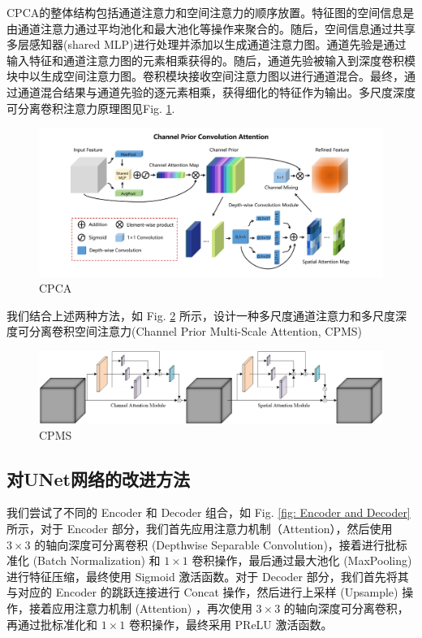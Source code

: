 \documentclass[a4paper]{ctexart}
\begin{document}
	CPCA的整体结构包括通道注意力和空间注意力的顺序放置。特征图的空间信息是由通道注意力通过平均池化和最大池化等操作来聚合的。随后，空间信息通过共享多层感知器(shared MLP)进行处理并添加以生成通道注意力图。通道先验是通过输入特征和通道注意力图的元素相乘获得的。随后，通道先验被输入到深度卷积模块中以生成空间注意力图。卷积模块接收空间注意力图以进行通道混合。最终，通过通道混合结果与通道先验的逐元素相乘，获得细化的特征作为输出。多尺度深度可分离卷积注意力原理图见Fig. \ref{fig: CPCA}.
	
	\begin{figure}[htbp]
		\centering
		\includegraphics[width=0.8\linewidth]{picture/LLIE/Experiment/Attention/CPCA}
		\caption{CPCA}
		\label{fig: CPCA}
	\end{figure}
	
	我们结合上述两种方法，如 Fig. \ref{fig: CPMS} 所示，设计一种多尺度通道注意力和多尺度深度可分离卷积空间注意力(Channel Prior Multi-Scale Attention, CPMS)
	
	\begin{figure}[htbp]
		\centering
		\includegraphics[width=0.8\linewidth]{picture/LLIE/Experiment/Attention/CPMS}
		\caption{CPMS}
		\label{fig: CPMS}
	\end{figure}
	
	
	\subsection*{对UNet网络的改进方法}
	
	我们尝试了不同的 Encoder 和 Decoder 组合，如 Fig. \ref{fig: Encoder and Decoder} 所示，对于 Encoder 部分，我们首先应用注意力机制（Attention），然后使用 $3 \times 3$ 的轴向深度可分离卷积 (Depthwise Separable Convolution)，接着进行批标准化 (Batch Normalization) 和 $1 \times 1$ 卷积操作，最后通过最大池化 (MaxPooling) 进行特征压缩，最终使用 Sigmoid 激活函数。对于 Decoder 部分，我们首先将其与对应的 Encoder 的跳跃连接进行 Concat 操作，然后进行上采样 (Upsample) 操作，接着应用注意力机制 (Attention) ，再次使用 $3 \times 3$ 的轴向深度可分离卷积，再通过批标准化和 $1 \times 1$ 卷积操作，最终采用 PReLU 激活函数。
	
\end{document}

